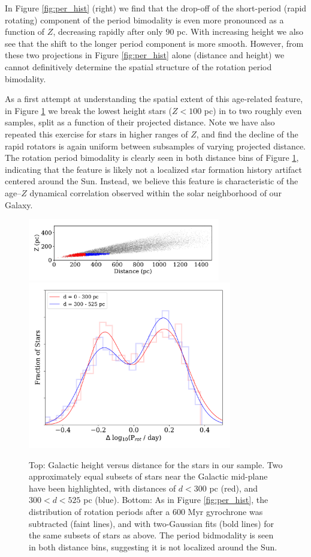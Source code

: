 \documentclass[preprint2]{aastex62}
\begin{document}
In Figure \ref{fig:per_hist} (right) we find that the drop-off of the short-period (rapid rotating) component of the period bimodality is even more pronounced as a function of $Z$, decreasing rapidly after only 90 pc. With increasing height we also see that the shift to the longer period component is more smooth. However, from these two projections in Figure \ref{fig:per_hist} alone (distance and height) we cannot definitively determine the spatial structure of the rotation period bimodality.


As a first attempt at understanding the spatial extent of this age-related feature, in Figure \ref{fig:dZ} we break the lowest height stars ($Z < 100$ pc) in to two roughly even samples, split as a function of their projected distance. Note we have also repeated this exercise for stars in higher ranges of $Z$, and find the decline of the rapid rotators is again uniform between subsamples of varying projected distance. The rotation period bimodality is clearly seen in both distance bins of Figure \ref{fig:dZ}, indicating that the feature is likely not a localized star formation history artifact centered around the Sun. Instead, we believe this feature is characteristic of the age--$Z$ dynamical correlation observed within the solar neighborhood of our Galaxy. 


\begin{figure}[!ht]
\centering
\includegraphics[width=3.3in]{../figures/dist_Z}
\includegraphics[width=3.5in]{../figures/delta_per_subZ}
\caption{
Top: Galactic height versus distance for the stars in our sample. Two approximately equal subsets of stars near the Galactic mid-plane have been highlighted, with distances of $d<300$ pc (red), and $300<d<525$ pc (blue).
Bottom: As in Figure \ref{fig:per_hist}, the distribution of rotation periods after a 600 Myr gyrochrone was subtracted (faint lines), and with two-Gaussian fits (bold lines) for the same subsets of stars as above. The period bidmodality is seen in both distance bins, suggesting it is not localized around the Sun.
}
\label{fig:dZ}
\end{figure}
\end{document}
